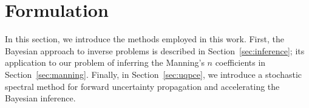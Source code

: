 \section{Formulation}
\label{sec:formu}
In this section, we introduce the methods employed in this work.
First, the Bayesian approach to inverse problems is described in Section~\ref{sec:inference};
its application to our problem of inferring the Manning's $n$ coefficients in Section~\ref{sec:manning}.
Finally, in Section~\ref{sec:uqpce}, we introduce
a stochastic spectral method for forward uncertainty propagation and accelerating the Bayesian inference.





